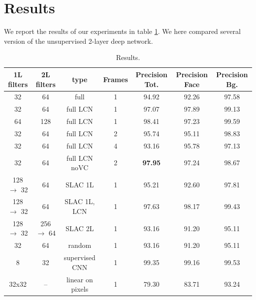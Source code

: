 \documentclass{article} %
\begin{document}



\section{Results}
\label{sec-results}


We report the results of our experiments in table \ref{table1}. We here compared several version of the unsupervised 2-layer deep network. 

\begin{table}[htdp]
\caption{Results.}
\begin{center}
\begin{tabular}{|c|c|c|c|c|c|c|}
\hline\hline
1L filters	& 2L filters	& type	& Frames	& Precision Tot. & Precision Face  & Precision Bg. \\ 
\hline
32 		& 64 		& full					& 1	& 94.92  		& 92.26		& 97.58  \\
32 		& 64 		& full LCN				& 1	& 97.07 		& 97.89		& 99.13  \\
64		& 128	& full LCN				& 1	& 98.41		& 97.23		& 99.59 \\
32 		& 64 		& full	 LCN				& 2	& 95.74		& 95.11		& 98.83  \\
32 		& 64 		& full LCN				& 4	& 93.16  		& 95.78		& 97.13  \\ 
32 		& 64 		& full LCN noVC	& 2	& \bf{97.95}  	& 97.24		& 98.67  \\ 
128 $\rightarrow$ 32 	& 64 		& SLAC 1L			& 1	& 95.21  		& 92.60		& 97.81  \\
128 $\rightarrow$ 32 	& 64 		& SLAC 1L, LCN		& 1	& 97.63 		& 98.17		& 99.43  \\ 
128 $\rightarrow$ 32 	& 256 $\rightarrow$ 64 	& SLAC 2L		& 1	& 93.16 		& 91.20		& 95.11  \\ 
32 		& 64 		& random				& 1	& 93.16 		& 91.20		& 95.11  \\ 
8 		& 32 		& supervised CNN		& 1	& 99.35 		& 99.16		& 99.53  \\ 
32x32 	& -- 		& linear on pixels		& 1	& 79.30 		& 83.71		& 93.24  \\ 
\hline\hline
\end{tabular}
\end{center}
\label{table1}
\end{table}
\end{document}
